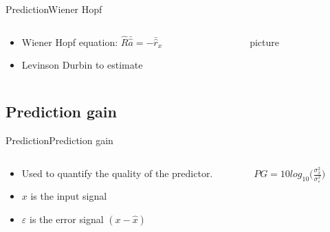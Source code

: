 \begin{frame}{Prediction}{Wiener Hopf}
	\begin{columns}
		\begin{column}{0.5\textwidth}
			\begin{itemize}
				\item Wiener Hopf equation: $\hat{R}  \bar{\hat{a}} = -\bar{\hat{r}}_x$
				\item Levinson Durbin to estimate 
			\end{itemize}
			
		\end{column}
		\begin{column}{0.5\textwidth} 
			picture	
		\end{column}
	\end{columns}
\end{frame}


\subsection{Prediction gain}
\begin{frame}{Prediction}{Prediction gain}
	\begin{columns}
		\begin{column}{0.5\textwidth}
			\begin{itemize}
			\item Used to quantify the quality of the predictor. 
			\item $x$ is the input signal
			\item $\varepsilon$ is the error signal $(x-\hat{x})$
			\end{itemize}
		\end{column}
		\begin{column}{0.5\textwidth} 
			$PG = 10 log_{10}\bigg(\frac{\sigma^2_x}{\sigma^2_\varepsilon}\bigg)	$
		\end{column}
	\end{columns}
\end{frame}


